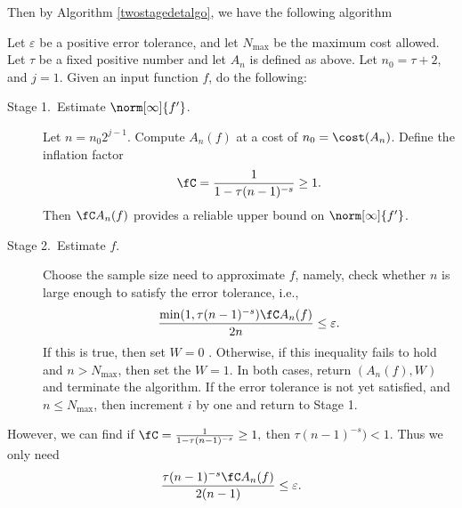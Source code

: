 Then by Algorithm \ref{twostagedetalgo}, we have the following algorithm
\begin{algo} \label{adpatalgo}
 Let $\varepsilon$ be a positive error tolerance, and let $N_{\max}$ be the maximum cost allowed.  Let $\tau$ be a fixed positive number and
 let $A_{n}$ is defined as above. Let $n_{0}= \tau+2,$ and $j=1.$ Given an input function $f$, do the following:

\begin{description}
\item[Stage 1.\ Estimate {$\norm[\infty]{f'}$}.] Let $n=n_{0}2^{j-1}.$ Compute $A_n(f)$ at a cost of $n_{0} = \cost(A_n)$.   Define the inflation factor
$$
\fC =\frac{1}{1 - \tau (n-1)^{-s}} \ge 1.
$$
Then $\fC A_{n}(f)$ provides a reliable upper bound on $\norm[\infty]{f'}$.

\item [Stage 2.\ Estimate {$f$}.] Choose the sample size need to approximate $f$, namely, check whether $n$ is large enough to satisfy the error tolerance, i.e.,
\[
\frac{\min(1,\tau (n-1)^{-s})\fC A_{n}(f)}{2n} \le \varepsilon.
\]
If this is true, then set $W=0$ .  Otherwise, if this inequality fails to hold and $n > N_{\max}$, then set the $W=1$.  In both cases, return $(A_{n}(f),W)$ and terminate the algorithm.  If the error tolerance is not yet satisfied, and $n \le N_{\max}$, then increment $i$ by one and return to Stage 1.

\end{description}

\end{algo}

However, we can find if $\fC =\frac{1}{1 - \tau (n-1)^{-s}} \ge 1,$ then $\tau (n-1)^{-s}) <1.$
Thus we only need \[
\frac{\tau (n-1)^{-s}\fC A_{n}(f)}{2(n-1)} \le \varepsilon.
\]


